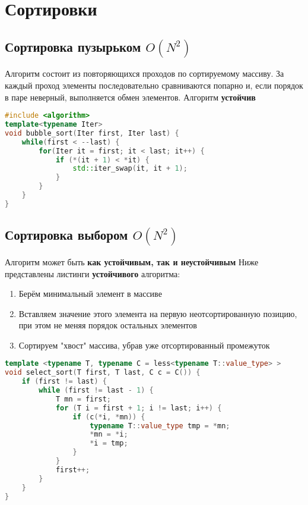 \chapter{Сортировки}
\section{Сортировка пузырьком $O(N^2)$}
Алгоритм состоит из повторяющихся проходов по сортируемому массиву. За каждый проход элементы последовательно сравниваются попарно и, если порядок в паре неверный, выполняется обмен элементов. \newline
Алгоритм \textbf{устойчив}

\begin{lstlisting}[language=C++]
#include <algorithm>
template<typename Iter>
void bubble_sort(Iter first, Iter last) {
    while(first < --last) {
        for(Iter it = first; it < last; it++) {
            if (*(it + 1) < *it) {
            	std::iter_swap(it, it + 1);
            }
		}
	}
}
\end{lstlisting}

\section{Сортировка выбором $O(N^2)$}
Алгоритм может быть \textbf{как устойчивым, так и неустойчивым}
Ниже представлены листинги \textbf{устойчивого} алгоритма:
\begin{enumerate}
\item Берём минимальный элемент в массиве
\item Вставляем значение этого элемента на первую неотсортированную позицию, при этом не меняя порядок остальных элементов
\item Сортируем "хвост" массива, убрав уже отсортированный промежуток
\end{enumerate}
\begin{lstlisting}[language=C++]
template <typename T, typename C = less<typename T::value_type> >
void select_sort(T first, T last, C c = C()) {
	if (first != last) {
        while (first != last - 1) {
            T mn = first;
            for (T i = first + 1; i != last; i++) {
                if (c(*i, *mn)) {
                    typename T::value_type tmp = *mn;
                    *mn = *i;
                    *i = tmp;
                }
            }
            first++;
        }
    }
}
\end{lstlisting}

